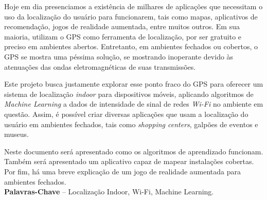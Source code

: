 \begin{resumo}

Hoje em dia presenciamos a existência de milhares de aplicações que necessitam o uso da localização do usuário para funcionarem, tais como mapas, aplicativos de recomendação, jogos de realidade aumentada, entre muitos outros. Em sua maioria, utilizam o GPS como ferramenta de localização, por ser gratuito e preciso em ambientes abertos. Entretanto, em ambientes fechados ou cobertos, o GPS se mostra uma péssima solução, se mostrando inoperante devido às atenuações das ondas eletromagnéticas de suas transmissões.
\par
Este projeto busca justamente explorar esse ponto fraco do GPS para oferecer um sistema de localização \textit{indoor} para dispositivos móveis, aplicando algoritmos de \textit{Machine Learning} a dados de intensidade de sinal de redes \textit{Wi-Fi} no ambiente em questão. Assim, é possível criar diversas aplicações que usam a localização do usuário em ambientes fechados, tais como \textit{shopping centers}, galpões de eventos e museus.
\par
Neste documento será apresentado como os algoritmos de aprendizado funcionam. Também será apresentado um aplicativo capaz de mapear instalações cobertas. Por fim, há uma breve explicação de um jogo de realidade aumentada para ambientes fechados.
%
\\[3\baselineskip]
%
\textbf{Palavras-Chave} -- Localização Indoor, Wi-Fi, Machine Learning.
\end{resumo}